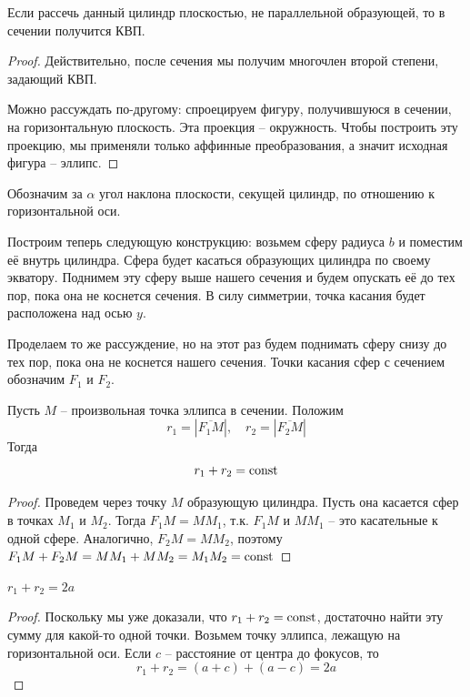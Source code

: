 \begin{Prop}
	Если рассечь данный цилиндр плоскостью, не параллельной образующей, то в сечении получится КВП.
\end{Prop}

\begin{proof}
	Действительно, после сечения мы получим многочлен второй степени, задающий КВП.

	Можно рассуждать по-другому: спроецируем фигуру, получившуюся в сечении, на горизонтальную плоскость. Эта проекция -- окружность.
	Чтобы построить эту проекцию, мы применяли только аффинные преобразования, а значит исходная фигура -- эллипс.
\end{proof}

Обозначим за $\alpha$ угол наклона плоскости, секущей цилиндр, по отношению к горизонтальной оси.

Построим теперь следующую конструкцию: возьмем сферу радиуса $b$ и поместим её внутрь цилиндра. Сфера будет касаться образующих цилиндра по своему экватору.
Поднимем эту сферу выше нашего сечения и будем опускать её до тех пор, пока она не коснется сечения.
В силу симметрии, точка касания будет расположена над осью $y$.

Проделаем то же рассуждение, но на этот раз будем поднимать сферу снизу до тех пор, пока она не коснется нашего сечения.
Точки касания сфер с сечением обозначим $F_1$ и $F_2$. 

\begin{Property}
	Пусть $M$ -- произвольная точка эллипса в сечении. Положим
	\[r_1 = |\overline{F_1 M}|, \quad r_2 = |\overline{F_2 M}|\]
	Тогда
	\[r_1 + r_2 = \operatorname{const}\]
\end{Property}

\begin{proof}
	Проведем через точку $M$ образующую цилиндра. Пусть она касается сфер в точках $M_1$ и $M_2$.
	Тогда $F_1 M = M M_1$, т.к. $F_1 M$ и $M M_1$ -- это касательные к одной сфере. Аналогично, $F_2 M = M M_2$, поэтому
	$F_1 M + F_2 M = M M_1 + M M_2 = M_1 M_2 = \operatorname{const}$ 
\end{proof}

\begin{Cons}
	$r_1 + r_2 = 2a$
\end{Cons}

\begin{proof}
	Поскольку мы уже доказали, что $r_1 + r_2 = \operatorname{const}$, достаточно найти эту сумму для какой-то одной точки. 
	Возьмем точку эллипса, лежащую на горизонтальной оси. 
	Если $c$ -- расстояние от центра до фокусов, то
	\[r_1 + r_2 = (a + c) + (a - c) = 2a\]
\end{proof}

